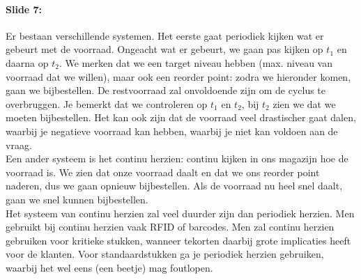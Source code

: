 \documentclass[10pt,a4paper]{report}
\begin{document}
\paragraph{Slide 7:} Er bestaan verschillende systemen. Het eerste gaat periodiek kijken wat er gebeurt met de voorraad. Ongeacht wat er gebeurt, we gaan pas kijken op $t_{1}$ en daarna op $t_{2}$. We merken dat we een target niveau hebben (max. niveau van voorraad dat we willen), maar ook een reorder point: zodra we hieronder komen, gaan we bijbestellen. De restvoorraad zal onvoldoende zijn om de cyclus te overbruggen. Je bemerkt dat we controleren op $t_{1}$ en $t_{2}$, bij $t_{2}$ zien we dat we moeten bijbestellen. Het kan ook zijn dat de voorraad veel drastischer gaat dalen, waarbij je negatieve voorraad kan hebben, waarbij je niet kan voldoen aan de vraag. \\
Een ander systeem is het continu herzien: continu kijken in ons magazijn hoe de voorraad is. We zien dat onze voorraad daalt en dat we ons reorder point naderen, dus we gaan opnieuw bijbestellen. Als de voorraad nu heel snel daalt, gaan we snel kunnen bijbestellen. \\
Het systeem van continu herzien zal veel duurder zijn dan periodiek herzien. Men gebruikt bij continu herzien vaak RFID of barcodes. Men zal continu herzien gebruiken voor kritieke stukken, wanneer tekorten daarbij grote implicaties heeft voor de klanten. Voor standaardstukken ga je periodiek herzien gebruiken, waarbij het wel eens (een beetje) mag foutlopen.
\end{document}

